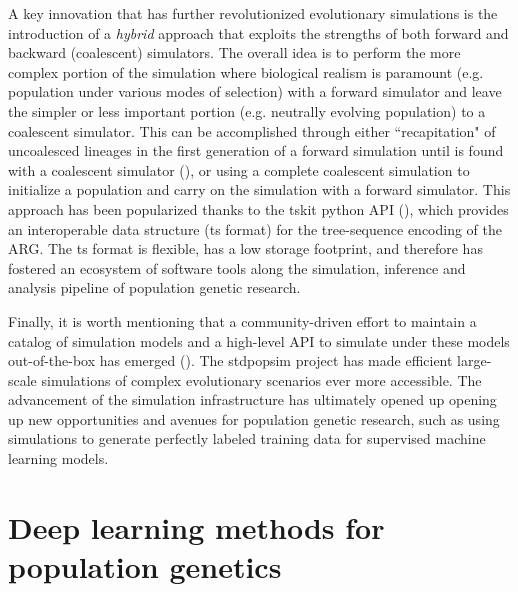 A key innovation that has further revolutionized evolutionary simulations is the introduction of a \textit{hybrid} approach that exploits the strengths of both forward and backward (coalescent) simulators. The overall idea is to perform the more complex portion of the simulation where biological realism is paramount (e.g. population under various modes of selection) with a forward simulator and leave the simpler or less important portion (e.g. neutrally evolving population) to a coalescent simulator. This can be accomplished through either ``recapitation" of uncoalesced lineages in the first generation of a forward simulation until  is found with a coalescent simulator (\cite{haller_slim_2019}), or using a complete coalescent simulation to initialize a population and carry on the simulation with a forward simulator. This approach has been popularized thanks to the tskit python API (\cite{kelleher2016efficient,kelleher2018efficient}), which provides an interoperable data structure (ts format) for the tree-sequence encoding of the \ac{ARG}. The ts format is flexible, has a low storage footprint, and therefore has fostered an ecosystem of software tools along the simulation, inference and analysis pipeline of population genetic research.

Finally, it is worth mentioning that a community-driven effort to maintain a catalog of simulation models and a high-level API to simulate under these models out-of-the-box has emerged (\cite{adrion_community-maintained_2020,lauterbur_expanding_2022}). The stdpopsim project has made efficient large-scale simulations of complex evolutionary scenarios ever more accessible. The advancement of the simulation infrastructure has ultimately opened up opening up new opportunities and avenues for population genetic research, such as using simulations to generate perfectly labeled training data for supervised machine learning models.

\section{Deep learning methods for population genetics} \label{intro-DL}

